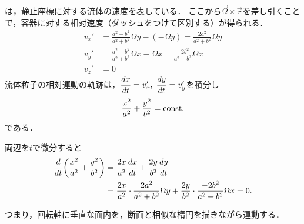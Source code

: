 \begin{kaitou}
は，静止座標に対する流体の速度を表している．
ここから$\vec{\Omega}\times\vec{r}$を差し引くことで，容器に対する相対速度（ダッシュをつけて区別する）が得られる．
\begin{align*}
    v_x' &= \frac{a^2-b^2}{a^2+b^2} \Omega y - (-\Omega y) = \frac{2a^2}{a^2+b^2} \Omega y \\
    v_y' &= \frac{a^2-b^2}{a^2+b^2} \Omega x - \Omega x = \frac{-2b^2}{a^2+b^2} \Omega x \\
    v_z' &= 0 
\end{align*}
流体粒子の相対運動の軌跡は，$\ddv{x}{t}=v_x', \; \ddv{y}{t}=v_y'$を積分し
\[
    \frac{x^2}{a^2} + \frac{y^2}{b^2} = \mathrm{const.}
\]
である．
\begin{details}
\nazenara
両辺を$t$で微分すると
\begin{align*}
    \dv{t} \pqty{\frac{x^2}{a^2} + \frac{y^2}{b^2}} &= \frac{2x}{a^2} \dv{x}{t} + \frac{2y}{b^2} \dv{y}{t} \\
    &= \frac{2x}{a^2} \cdot \frac{2a^2}{a^2+b^2} \Omega y + \frac{2y}{b^2} \cdot \frac{-2b^2}{a^2+b^2} \Omega x = 0.
\end{align*}
\end{details}
\noindent
つまり，回転軸に垂直な面内を，断面と相似な楕円を描きながら運動する．
\end{kaitou}




